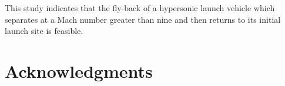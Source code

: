 \documentclass[conf]{new-aiaa}
\begin{document}
This study indicates that the fly-back of a hypersonic launch vehicle which separates at a Mach number greater than nine and then returns to its initial launch site is feasible. 

\section*{Acknowledgments}



\end{document}
